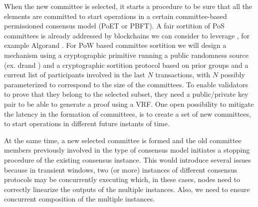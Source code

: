 When the new committee is selected, it starts a procedure to be sure that all the elements are committed to start operations in a certain committee-based permissioned consensus model (\gls{PoET} or \gls{PBFT}). A fair sortition of \gls{PoS} committees is already addressed by blockchains we can consider to leverage \mysystem, for example Algorand \cite{algorand}. For \gls{PoW} based committee sortition we will design a mechanism using a cryptographic primitive running a public randomness source (ex. drand \cite{drand}) and a cryptographic sortition protocol based on prior groups and a current list of participants involved in the last $N$ transactions, with $N$ possibly parameterized to correspond to the size of the committees. To enable validators to prove that they belong to the selected subset, they need a public/private key pair to be able to generate a proof using a \gls{VRF}. One open possibility to mitigate the latency in the formation of committees, is to create a set of new committees, to start operations in different future instants of time.

At the same time, a new selected committee is formed and the old committee members previously involved in the type of consensus model initiates a stopping procedure of the existing consensus instance. This would introduce several issues because in transient windows, two (or more) instances of different consensus protocols may be concurrently executing which, in these cases, nodes need to correctly linearize the outputs of the multiple instances. Also, we need to ensure concurrent composition of the multiple instances.





